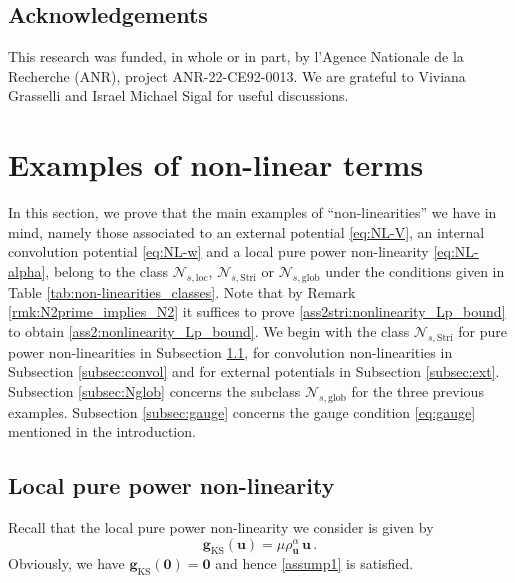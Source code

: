 \documentclass[12pt,a4paper]{amsart}
\numberwithin{equation}{section}
\newcommand{\ulu}{\boldsymbol{u}}
\newcommand{\ulg}{\boldsymbol{g}}
\newcommand{\ulzero}{\boldsymbol{0}}
\newcommand{\Nloc}{\mathscr{N}_{s,\mathrm{loc}}}
\newcommand{\Nglob}{\mathscr{N}_{s,\mathrm{glob}}}
\newcommand{\NStri}{\mathscr{N}_{s,\mathrm{Stri}}}
\begin{document}
	\subsection*{Acknowledgements}
	This research was funded, in whole or in part, by l’Agence Nationale de la Recherche
	(ANR), project ANR-22-CE92-0013. We are grateful to Viviana Grasselli and Israel Michael Sigal for useful discussions. 
	
	\section{Examples of non-linear terms}\label{sec:examples}
	
	
	In this section, we prove that the main examples of ``non-linearities'' we have in mind, namely those associated to an external potential \eqref{eq:NL-V}, an internal convolution potential \eqref{eq:NL-w} and a local pure power non-linearity \eqref{eq:NL-alpha}, belong to the class $\Nloc$, $\NStri$ or $\Nglob$ under the conditions given in Table \ref{tab:non-linearities_classes}. Note that by Remark \ref{rmk:N2prime_implies_N2} it suffices to prove \ref{ass2stri:nonlinearity_Lp_bound} to obtain \ref{ass2:nonlinearity_Lp_bound}.
	We begin with the class $\NStri$ for pure power non-linearities in Subsection \ref{subsec:pure}, for convolution non-linearities in Subsection \ref{subsec:convol} and for external potentials in Subsection \ref{subsec:ext}. Subsection \ref{subsec:Nglob} concerns the subclass $\Nglob$ for the three previous examples. Subsection \ref{subsec:gauge} concerns the gauge condition \eqref{eq:gauge} mentioned in the introduction. 
	
	
	\subsection{Local pure power non-linearity}\label{subsec:pure}
	
	Recall that  the local pure power non-linearity we consider is given by
	\begin{equation}
		\ulg_{\mathrm{KS}}(\ulu) = 	\mu \rho_{\ulu}^\alpha \, \ulu\, .
	\end{equation} 
	Obviously, we have $\ulg_{\mathrm{KS}}(\ulzero)=\ulzero$ and hence \ref{assump1} is satisfied.
	
\end{document}
